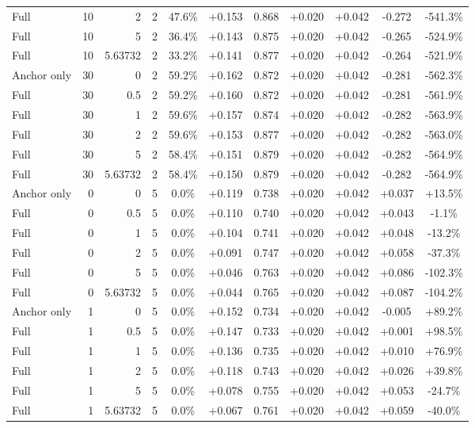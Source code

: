 \begin{table}[htbp]
\begin{tabular}{lrrrccccccc}
Full & 10 & 2 & 2 & 47.6\% & +0.153 & 0.868 & +0.020 & +0.042 & -0.272 & -541.3\% \\
Full & 10 & 5 & 2 & 36.4\% & +0.143 & 0.875 & +0.020 & +0.042 & -0.265 & -524.9\% \\
Full & 10 & 5.63732 & 2 & 33.2\% & +0.141 & 0.877 & +0.020 & +0.042 & -0.264 & -521.9\% \\
Anchor only & 30 & 0 & 2 & 59.2\% & +0.162 & 0.872 & +0.020 & +0.042 & -0.281 & -562.3\% \\
Full & 30 & 0.5 & 2 & 59.2\% & +0.160 & 0.872 & +0.020 & +0.042 & -0.281 & -561.9\% \\
Full & 30 & 1 & 2 & 59.6\% & +0.157 & 0.874 & +0.020 & +0.042 & -0.282 & -563.9\% \\
Full & 30 & 2 & 2 & 59.6\% & +0.153 & 0.877 & +0.020 & +0.042 & -0.282 & -563.0\% \\
Full & 30 & 5 & 2 & 58.4\% & +0.151 & 0.879 & +0.020 & +0.042 & -0.282 & -564.9\% \\
Full & 30 & 5.63732 & 2 & 58.4\% & +0.150 & 0.879 & +0.020 & +0.042 & -0.282 & -564.9\% \\
Anchor only & 0 & 0 & 5 & 0.0\% & +0.119 & 0.738 & +0.020 & +0.042 & +0.037 & +13.5\% \\
Full & 0 & 0.5 & 5 & 0.0\% & +0.110 & 0.740 & +0.020 & +0.042 & +0.043 & -1.1\% \\
Full & 0 & 1 & 5 & 0.0\% & +0.104 & 0.741 & +0.020 & +0.042 & +0.048 & -13.2\% \\
Full & 0 & 2 & 5 & 0.0\% & +0.091 & 0.747 & +0.020 & +0.042 & +0.058 & -37.3\% \\
Full & 0 & 5 & 5 & 0.0\% & +0.046 & 0.763 & +0.020 & +0.042 & +0.086 & -102.3\% \\
Full & 0 & 5.63732 & 5 & 0.0\% & +0.044 & 0.765 & +0.020 & +0.042 & +0.087 & -104.2\% \\
Anchor only & 1 & 0 & 5 & 0.0\% & +0.152 & 0.734 & +0.020 & +0.042 & -0.005 & +89.2\% \\
Full & 1 & 0.5 & 5 & 0.0\% & +0.147 & 0.733 & +0.020 & +0.042 & +0.001 & +98.5\% \\
Full & 1 & 1 & 5 & 0.0\% & +0.136 & 0.735 & +0.020 & +0.042 & +0.010 & +76.9\% \\
Full & 1 & 2 & 5 & 0.0\% & +0.118 & 0.743 & +0.020 & +0.042 & +0.026 & +39.8\% \\
Full & 1 & 5 & 5 & 0.0\% & +0.078 & 0.755 & +0.020 & +0.042 & +0.053 & -24.7\% \\
Full & 1 & 5.63732 & 5 & 0.0\% & +0.067 & 0.761 & +0.020 & +0.042 & +0.059 & -40.0\% \\

\end{tabular}
\end{table}

